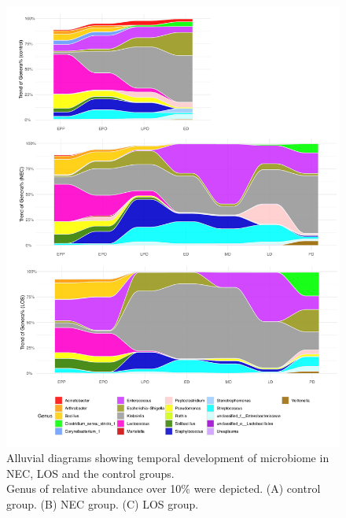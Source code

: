 \documentclass[fleqn,10pt, lineno]{wlpeerj} %
\begin{document}
\begin{figure}[ht]\centering
  \includegraphics[width=\linewidth]{taxon2.pdf}
  \caption{Alluvial diagrams showing temporal development of microbiome in NEC, LOS and the control groups. \\ Genus of relative abundance over 10\% were depicted. (A) control group. (B) NEC group. (C) LOS group.}
  \label{fig:taxa-time}
\end{figure}




\end{document}
